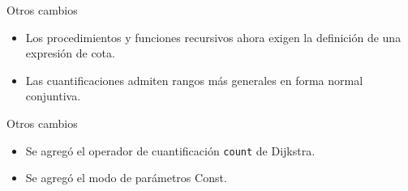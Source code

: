\begin{frame}{Otros cambios}
\begin{itemize}
  \item Los procedimientos y funciones recursivos ahora exigen la definición de una expresión de cota. \boundproc{}

  \item Las cuantificaciones admiten rangos más generales en forma normal conjuntiva. \cnfquant{}
\end{itemize}
\end{frame}

\begin{frame}{Otros cambios}
\begin{itemize}
  \item Se agregó el operador de cuantificación \texttt{count} de Dijkstra. \countquant{}

  \item Se agregó el modo de parámetros Const. \constmode{}

\end{itemize}
\end{frame}
